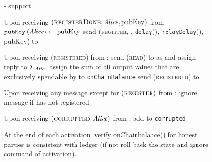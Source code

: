 \begin{figure}[H]
\begin{systembox}{\fpaynet - support}
\begin{algorithmic}[1]
        \State Upon receiving $\left(\textsc{registerDone}, \mathit{Alice},
        \mathrm{pubKey}\right)$ from \simulator:
        \Indent
          \State $\mathtt{pubKey}\left(\mathit{Alice}\right) \gets \mathrm{pubKey}$
          \State send (\textsc{register}, \alice, \texttt{delay}(\alice),
          \texttt{relayDelay}(\alice), pubKey) to \alice
        \EndIndent
        \Statex

        \State Upon receiving (\textsc{registered}) from \alice:
        \Indent
          \State send (\textsc{read}) to \ledger{} as \alice{} and assign reply
          to $\Sigma_{\mathit{Alice}}$
          \State assign the sum of all output values that are exclusively
          spendable by \alice{} to \texttt{onChainBalance}
          \State send (\textsc{registered}) to \alice
        \EndIndent
        \Statex

        \State Upon receiving any message except for
        $\left(\textsc{register}\right)$ from \alice:
        \Indent
          \State ignore message if \alice{} has not registered
        \EndIndent
        \Statex

        \State Upon receiving $\left(\textsc{corrupted}, \mathit{Alice}\right)$ from
        \simulator:
        \Indent
          \State add \alice{} to \texttt{corrupted}
        \EndIndent
        \Statex

        \State At the end of each activation: 
        \Indent
          \State verify onChainbalance() for honest parties is consistent with
          ledger (if not roll back the state and ignore command of activation).
        \EndIndent
      \end{algorithmic}
    \end{systembox}
    \caption{}
    \label{alg:fpaynet:support}
  \end{figure}

